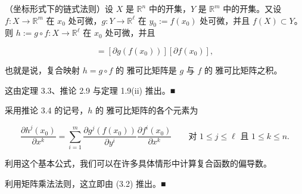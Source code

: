 \begin{corollary}

（坐标形式下的链式法则）设 $ X $ 是 $ \mathbb{R}^n $ 中的开集，$ Y $ 是 $ \mathbb{R}^m $ 中的开集。又设 $ f : X \to \mathbb{R}^m $ 在 $ x_0 $ 处可微，$ g : Y \to \mathbb{R}^\ell $ 在 $ y_0 := f(x_0) $ 处可微，并且 $ f(X) \subset Y $。则 $ h := g \circ f : X \to \mathbb{R}^\ell $ 在 $ x_0 $ 处可微，并且

\begin{equation}
[\partial h(x_0)] = [\partial g(f(x_0))][\partial f(x_0)] ,\tag{3.2}
\end{equation}

也就是说，复合映射 $ h = g \circ f $ 的 雅可比矩阵是 $ g $ 与 $ f $ 的 雅可比矩阵之积。

\proofhead
这由定理 3.3、推论 2.9 与定理 1.9(ii) 推出。\nobreak\hspace{0.35em}■
\end{corollary}

\begin{remark}

采用推论 3.4 的记号，$ h $ 的 雅可比矩阵的各个元素为

\[
\frac{\partial h^j(x_0)}{\partial x^k} = \sum_{i=1}^{m} \frac{\partial g^j(f(x_0))}{\partial y^i}\frac{\partial f^i(x_0)}{\partial x^k} \qquad \text{对 } 1 \le j \le \ell \text{ 且 } 1 \le k \le n .
\]

利用这个基本公式，我们可以在许多具体情形中计算复合函数的偏导数。

\proofhead
利用矩阵乘法法则，这立即由 (3.2) 推出。\nobreak\hspace{0.35em}■
\end{remark}

